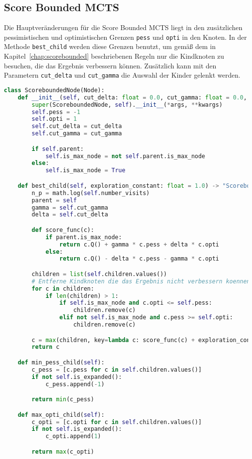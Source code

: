 \subsection{Score Bounded MCTS}

Die Hauptveränderungen für die Score Bounded MCTS liegt in den zusätzlichen pessimistischen und optimistischen Grenzen \verb|pess| und \verb|opti| in den Knoten.
In der Methode \verb|best_child| werden diese Grenzen benutzt, um gemäß dem in Kapitel~\ref{chap:scorebounded} beschriebenen Regeln nur die Kindknoten zu besuchen, die das Ergebnis verbessern können.
Zusätzlich kann mit den Parametern \verb|cut_delta| und \verb|cut_gamma| die Auswahl der Kinder gelenkt werden.

\begin{lstlisting}[language=Python,label={lst:scorebounded-node}]
class ScoreboundedNode(Node):
    def __init__(self, cut_delta: float = 0.0, cut_gamma: float = 0.0, *args, **kwargs):
        super(ScoreboundedNode, self).__init__(*args, **kwargs)
        self.pess = -1
        self.opti = 1
        self.cut_delta = cut_delta
        self.cut_gamma = cut_gamma

        if self.parent:
            self.is_max_node = not self.parent.is_max_node
        else:
            self.is_max_node = True

    def best_child(self, exploration_constant: float = 1.0) -> "ScoreboundedNode":
        n_p = math.log(self.number_visits)
        parent = self
        gamma = self.cut_gamma
        delta = self.cut_delta

        def score_func(c):
            if parent.is_max_node:
                return c.Q() + gamma * c.pess + delta * c.opti
            else:
                return c.Q() - delta * c.pess - gamma * c.opti

        children = list(self.children.values())
        # Entferne Kindknoten die das Ergebnis nicht verbessern koennen
        for c in children:
            if len(children) > 1:
                if self.is_max_node and c.opti <= self.pess:
                    children.remove(c)
                elif not self.is_max_node and c.pess >= self.opti:
                    children.remove(c)

        c = max(children, key=lambda c: score_func(c) + exploration_constant * math.sqrt(n_p / c.number_visits))
        return c

    def min_pess_child(self):
        c_pess = [c.pess for c in self.children.values()]
        if not self.is_expanded():
            c_pess.append(-1)

        return min(c_pess)

    def max_opti_child(self):
        c_opti = [c.opti for c in self.children.values()]
        if not self.is_expanded():
            c_opti.append(1)

        return max(c_opti)
\end{lstlisting}


